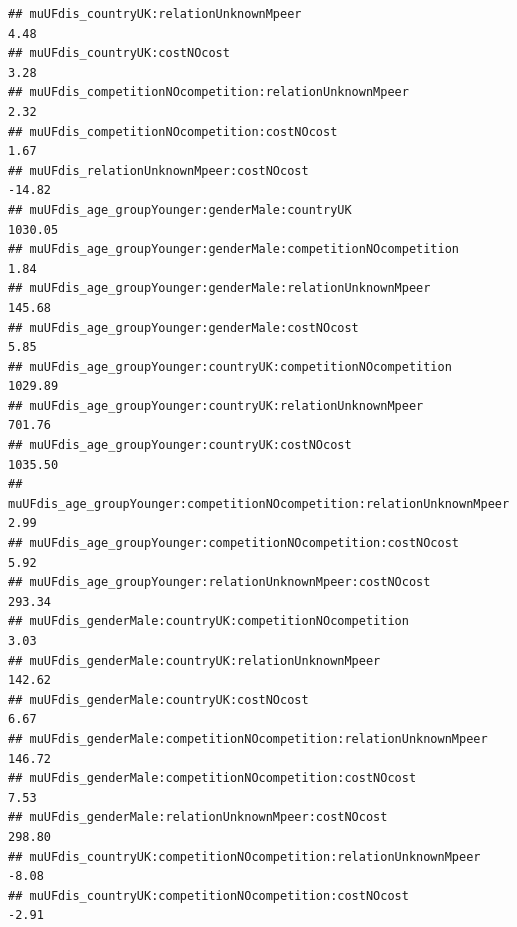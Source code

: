 \documentclass[
]{article}
\begin{document}
\begin{verbatim}
## muUFdis_countryUK:relationUnknownMpeer                                                                     4.48
## muUFdis_countryUK:costNOcost                                                                               3.28
## muUFdis_competitionNOcompetition:relationUnknownMpeer                                                      2.32
## muUFdis_competitionNOcompetition:costNOcost                                                                1.67
## muUFdis_relationUnknownMpeer:costNOcost                                                                  -14.82
## muUFdis_age_groupYounger:genderMale:countryUK                                                           1030.05
## muUFdis_age_groupYounger:genderMale:competitionNOcompetition                                               1.84
## muUFdis_age_groupYounger:genderMale:relationUnknownMpeer                                                 145.68
## muUFdis_age_groupYounger:genderMale:costNOcost                                                             5.85
## muUFdis_age_groupYounger:countryUK:competitionNOcompetition                                             1029.89
## muUFdis_age_groupYounger:countryUK:relationUnknownMpeer                                                  701.76
## muUFdis_age_groupYounger:countryUK:costNOcost                                                           1035.50
## muUFdis_age_groupYounger:competitionNOcompetition:relationUnknownMpeer                                     2.99
## muUFdis_age_groupYounger:competitionNOcompetition:costNOcost                                               5.92
## muUFdis_age_groupYounger:relationUnknownMpeer:costNOcost                                                 293.34
## muUFdis_genderMale:countryUK:competitionNOcompetition                                                      3.03
## muUFdis_genderMale:countryUK:relationUnknownMpeer                                                        142.62
## muUFdis_genderMale:countryUK:costNOcost                                                                    6.67
## muUFdis_genderMale:competitionNOcompetition:relationUnknownMpeer                                         146.72
## muUFdis_genderMale:competitionNOcompetition:costNOcost                                                     7.53
## muUFdis_genderMale:relationUnknownMpeer:costNOcost                                                       298.80
## muUFdis_countryUK:competitionNOcompetition:relationUnknownMpeer                                           -8.08
## muUFdis_countryUK:competitionNOcompetition:costNOcost                                                     -2.91

\end{verbatim}
\end{document}
